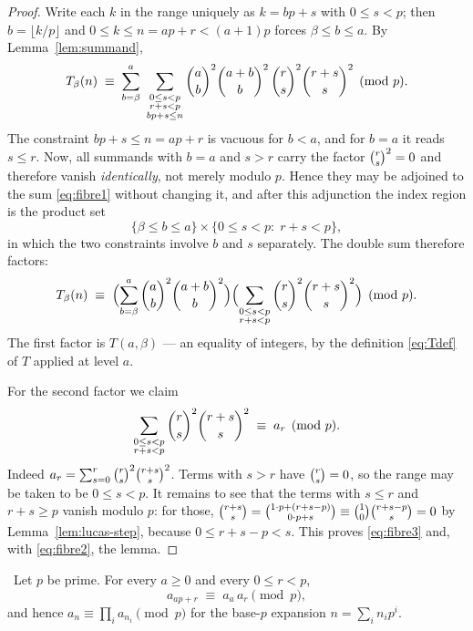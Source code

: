 \begin{proof}
Write each $k$ in the range uniquely as $k=bp+s$ with $0\le s<p$; then $b=\lfloor
k/p\rfloor$ and $0\le k\le n=ap+r<(a+1)p$ forces $\beta\le b\le a$. By
Lemma~\ref{lem:summand},
\begin{equation}\label{eq:fibre1}
   T_\beta(n)\;\equiv\;
   \sum_{b=\beta}^{a}\ \sum_{\substack{0\le s<p\\ r+s<p\\ bp+s\le n}}
   \binom{a}{b}^2\binom{a+b}{b}^2\,\binom{r}{s}^2\binom{r+s}{s}^2 \pmod p .
\end{equation}
The constraint $bp+s\le n=ap+r$ is vacuous for $b<a$, and for $b=a$ it reads $s\le r$.
Now, all summands with $b=a$ and $s>r$ carry the factor $\binom{r}{s}^2=0$ and therefore vanish
\emph{identically}, not merely modulo $p$. Hence they may be adjoined to the sum
\eqref{eq:fibre1} without changing it, and after this adjunction the index region is the
product set
\[
  \{\beta\le b\le a\}\times\{0\le s<p:\;r+s<p\},
\]
in which the two constraints involve $b$ and $s$ separately. The double sum therefore
factors:
\begin{equation}\label{eq:fibre2}
  T_\beta(n)\;\equiv\;
  \Bigl(\sum_{b=\beta}^{a}\binom{a}{b}^2\binom{a+b}{b}^2\Bigr)
  \Bigl(\sum_{\substack{0\le s<p\\ r+s<p}}\binom{r}{s}^2\binom{r+s}{s}^2\Bigr)\pmod p .
\end{equation}
The first factor is $T(a,\beta)$ --- an equality of integers, by the definition
\eqref{eq:Tdef} of $T$ applied at level $a$.

For the second factor we claim
\begin{equation}\label{eq:fibre3}
   \sum_{\substack{0\le s<p\\ r+s<p}}\binom{r}{s}^2\binom{r+s}{s}^2\;\equiv\;a_r \pmod p .
\end{equation}
Indeed $a_r=\sum_{s=0}^{r}\binom{r}{s}^2\binom{r+s}{s}^2$. Terms with $s>r$ have $\binom{r}{s}=0$, so
the range may be taken to be $0\le s<p$. It remains to see that the terms with $s\le r$
and $r+s\ge p$ vanish modulo $p$: for those,
$\binom{r+s}{s}=\binom{1\cdot p+(r+s-p)}{0\cdot p+s}\equiv\binom{1}{0}\binom{r+s-p}{s}=0$ by
Lemma~\ref{lem:lucas-step}, because $0\le r+s-p<s$. This proves \eqref{eq:fibre3} and,
with \eqref{eq:fibre2}, the lemma.
\end{proof}

\begin{theorem}\label{thm:arow}
\Proved\ Let $p$ be prime. For every $a\ge0$ and every $0\le r<p$,
\[
   a_{ap+r}\;\equiv\;a_a\,a_r\pmod p ,
\]
and hence $a_n\equiv\prod_i a_{n_i}\pmod p$ for the base-$p$ expansion $n=\sum_in_ip^i$.
\end{theorem}

